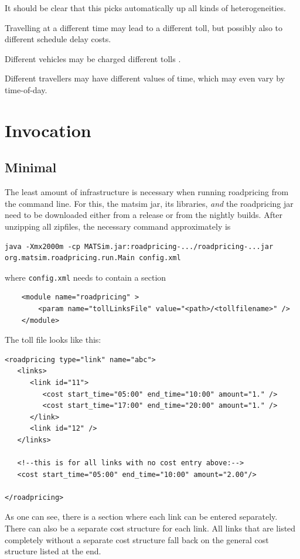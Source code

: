 It should be clear that this picks automatically up all kinds of heterogeneities.  



\begin{compactitem}

\item Travelling at a different time may lead to a different toll, but possibly also to different schedule delay costs. 

\item Different vehicles may be charged different tolls \citep{KickhoeferNagel2012EmissionInternalization}.

\item Different travellers may have different values of time, which may even vary by time-of-day.
  
\end{compactitem}

\section{Invocation}

\subsection{Minimal}

The least amount of infrastructure is necessary when running roadpricing from the command line.  For this, the \acrshort{matsim} jar, its libraries, \emph{and} the roadpricing jar need to be downloaded either from a release or from the nightly builds.   After unzipping all zipfiles, the necessary command approximately is
\begin{lstlisting}
java -Xmx2000m -cp MATSim.jar:roadpricing-.../roadpricing-...jar org.matsim.roadpricing.run.Main config.xml  
\end{lstlisting}
where \verb$config.xml$ needs to contain a section
\begin{lstlisting}
	<module name="roadpricing" >
		<param name="tollLinksFile" value="<path>/<tollfilename>" />
	</module>
\end{lstlisting}
The toll file looks like this:
\begin{lstlisting}
<roadpricing type="link" name="abc">
   <links>
      <link id="11">
         <cost start_time="05:00" end_time="10:00" amount="1." />
         <cost start_time="17:00" end_time="20:00" amount="1." />
      </link>             
      <link id="12" />
   </links>

   <!--this is for all links with no cost entry above:-->
   <cost start_time="05:00" end_time="10:00" amount="2.00"/>

</roadpricing>
\end{lstlisting}
As one can see, there is a section where each link can be entered separately.  There can also be a separate cost structure for each link.  All links that are listed completely without a separate cost structure fall back on the general cost structure listed at the end.

